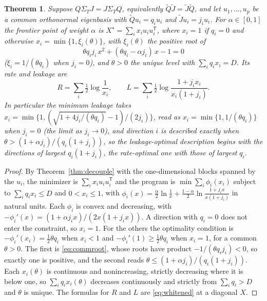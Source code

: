 \documentclass[11pt,onecolumn]{IEEEtran}
\newtheorem{theorem}{Theorem}
\begin{document}
\begin{theorem}\label{thm:commuting}
Suppose $Q\Sigma_TJ=J\Sigma_TQ$, equivalently $\tilde Q\tilde J=\tilde J\tilde Q$,
and let $u_1,\dots,u_p$ be a common orthonormal eigenbasis with
$\tilde Qu_i=q_iu_i$ and $\tilde Ju_i=j_iu_i$. For $\alpha\in[0,1]$ the
frontier point of weight $\alpha$ is
$X^\star=\sum_ix_iu_iu_i^{\mathsf T}$, where $x_i=1$ if $q_i=0$ and
otherwise $x_i=\min\{1,\xi_i(\theta)\}$, with $\xi_i(\theta)$ the positive
root of
\begin{equation}
\theta q_ij_i\,x^2+(\theta q_i-\alpha j_i)\,x-1=0
\label{eq:commroot}
\end{equation}
($\xi_i=1/(\theta q_i)$ when $j_i=0$), and $\theta>0$ the unique level with
$\sum_iq_ix_i=D$. Its rate and leakage are
\[
R=\sum_i\tfrac12\log\frac1{x_i},
\qquad
L=\sum_i\tfrac12\log\frac{1+j_ix_i}{x_i(1+j_i)} .
\]
In particular the minimum leakage takes
$x_i=\min\bigl\{1,(\sqrt{1+4j_i/(\theta q_i)}-1)/(2j_i)\bigr\}$, read as
$x_i=\min\{1,1/(\theta q_i)\}$ when $j_i=0$ (the limit as $j_i\to0$), and direction
$i$ is described exactly when $\theta>(1+\alpha j_i)/(q_i(1+j_i))$, so the
leakage-optimal description begins with the directions of largest
$q_i(1+j_i)$, the rate-optimal one with those of largest $q_i$.
\end{theorem}

\begin{proof}
By Theorem~\ref{thm:decouple} with the one-dimensional blocks spanned by
the $u_i$, the minimizer is $\sum_ix_iu_iu_i^{\mathsf T}$ and the program is
$\min\sum_i\phi_i(x_i)$ subject to $\sum_iq_ix_i\le D$ and $0<x_i\le1$, with
$\phi_i(x)=\tfrac\alpha2\ln\frac1x+\tfrac{1-\alpha}2\ln\frac{1+j_ix}{x(1+j_i)}$
in natural units. Each $\phi_i$ is convex and decreasing, with
$-\phi_i'(x)=(1+\alpha j_ix)/(2x(1+j_ix))$. A direction with $q_i=0$ does
not enter the constraint, so $x_i=1$. For the others the optimality
condition is $-\phi_i'(x_i)=\tfrac12\theta q_i$ when $x_i<1$ and
$-\phi_i'(1)\ge\tfrac12\theta q_i$ when $x_i=1$, for a common $\theta>0$.
The first is \eqref{eq:commroot}, whose roots have product
$-1/(\theta q_ij_i)<0$, so exactly one is positive, and the second
reads $\theta\le(1+\alpha j_i)/(q_i(1+j_i))$. Each $x_i(\theta)$ is
continuous and nonincreasing, strictly decreasing where it is below one,
so $\sum_iq_ix_i(\theta)$ decreases continuously and strictly from
$\sum_iq_i>D$ and $\theta$ is unique. The formulas for $R$ and $L$ are
\eqref{eq:whitened} at a diagonal $X$.
\end{proof}
\end{document}
